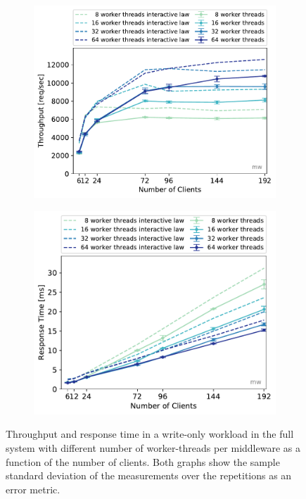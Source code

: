 \documentclass[11pt,a4paper]{article}
\begin{document}
\begin{figure}
	\begin{subfigure}[b]{.49\linewidth}
		\centering
		\includegraphics[width=\linewidth]{data/exp41_wo_tp_nc_w.pdf}
	\end{subfigure}\hfill
	\begin{subfigure}[b]{.49\linewidth}
		\centering
		\includegraphics[width=\linewidth]{data/exp41_wo_rt_nc_w.pdf}
	\end{subfigure}%
	\caption{Throughput and response time in a write-only workload in the full system with different number of worker-threads per middleware as a function of the number of clients. Both graphs show the sample standard deviation of the measurements over the repetitions as an error metric.}\label{exp41_tp_rt_nc}
\end{figure}
\end{document}
